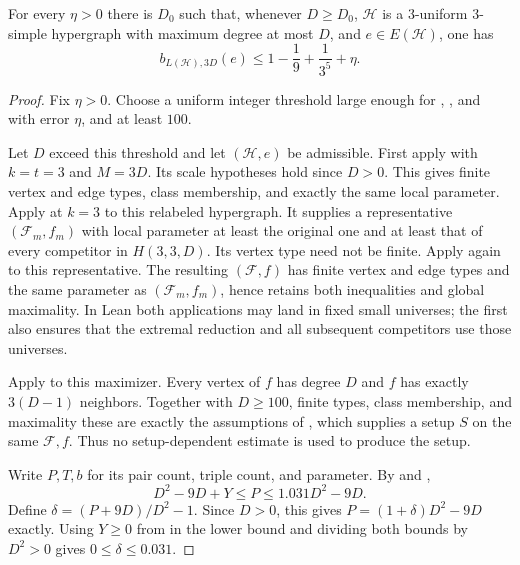 \begin{lemma}
For every $\eta>0$ there is $D_0$ such that, whenever $D\ge D_0$,
$\mathcal H$ is a $3$-uniform $3$-simple hypergraph with maximum degree at
most $D$, and $e\in E(\mathcal H)$, one has
\[
b_{L(\mathcal H),3D}(e)\le 1-\frac19+\frac1{3^5}+\eta .
\]
\end{lemma}
\begin{proof}
Fix $\eta>0$. Choose a uniform integer threshold large enough for
,
, and
 with error $\eta$,
and at least $100$.

Let $D$ exceed this threshold and let $(\mathcal H,e)$ be admissible.
First apply  with $k=t=3$ and
$M=3D$. Its scale hypotheses hold since $D>0$. This gives finite vertex
and edge types, class membership, and exactly the same local parameter.
Apply  at $k=3$
to this relabeled hypergraph. It supplies a representative
$(\mathcal F_m,f_m)$ with local parameter at least the original one
and at least that of every competitor in $H(3,3,D)$. Its vertex type
need not be finite. Apply 
again to this representative. The resulting $(\mathcal F,f)$ has
finite vertex and edge types and the same parameter as
$(\mathcal F_m,f_m)$, hence retains both inequalities and global
maximality. In Lean both applications may land in fixed small universes;
the first also ensures that the extremal reduction and all subsequent
competitors use those universes.

Apply  to this
maximizer. Every vertex of $f$ has degree $D$ and $f$ has exactly
$3(D-1)$ neighbors. Together with $D\ge100$, finite types, class
membership, and maximality these are exactly the assumptions of
, which supplies a
setup $S$ on the same $\mathcal F,f$. Thus no setup-dependent estimate
is used to produce the setup.

Write $P,T,b$ for its pair count, triple count, and parameter.
By  and
,
\[
 D^2-9D+Y\le P\le1.031D^2-9D .
\]
Define $\delta=(P+9D)/D^2-1$. Since $D>0$, this gives
$P=(1+\delta)D^2-9D$ exactly. Using $Y\ge0$ from
 in the lower bound and
dividing both bounds by $D^2>0$ gives $0\le\delta\le0.031$.


\end{proof}
